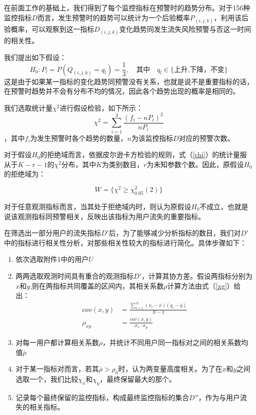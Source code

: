 \documentclass{my_paper}
\begin{document}
在前面工作的基础上，我们得到了每个监控指标在预警时的趋势分布。对于156种监控指标$D$而言，发生预警时的趋势可以统计为一个后验概率$P_{(i,j,k)}$，利用该后验概率，可以观察到这一指标$D_{(i,j,k)}$变化趋势同发生流失风险预警与否这一时间的相关性。

我们提出如下假设：
\begin{equation}
    H_0 : P_{l} = P(Q_{(i,j,k)}=q_l) = \frac{1}{3} ,\quad \text{其中} \quad q_l \in\{\text{上升,下降，不变}\}
\end{equation}
这是由于如果某一指标的变化趋势同预警没有关系，也就是说不是重要指标的话，在预警时趋势并不会有分布不均的情况，因此各个趋势出现的概率是相同的。

我们选取统计量$\chi ^2$进行假设检验，如下所示：
\begin{equation}
    \chi ^2 = \sum_{i=1}^3\frac{(f_i-nP_i)^2}{nP_i}
    \label{chi}
\end{equation}
，其中$f_i$为发生预警时各个趋势的数量，$n$为该监控指标$D$对应的预警次数。

对于假设$H_0$的拒绝域而言，依据皮尔逊卡方检验的规则\cite{3}，式（\ref{chi}）的统计量服从于$K-r-1$的$\chi ^2$分布，其中$K$为类别数目，$r$为未知参数个数。因此，原假设$H_0$的拒绝域为：

\begin{equation}
   W = \{\chi^2 \geq  \chi^2_{0.05}(2) \}
\label{}
\end{equation}

对于任意观测指标而言，当其处于拒绝域内时，则认为原假设$H_0$不成立，也就是说该观测指标同预警相关，反映出该指标为用户流失的重要指标。

在筛选出一部分用户的流失指标$D'$后，为了能够减少分析指标的数目，我们对$D'$中的指标进行相关性分析，对那些相关性较大的指标进行简化。具体步骤如下：
\begin{enumerate}
    \item 依次选取附件1中的用户$U$
    \item 两两选取观测时间具有重合的观测指标$D'$，计算其协方差。假设两指标分别为$x$和$y$,则在两指标共同覆盖的区间内，其相关系数$\rho$计算方法由式（\ref{xg}）给出：
    \begin{align}
    cov(x,y) &= \frac{\sum_{i=1}^N(x_i-\bar{x} )(y_i-\bar{y})}{N-1}\\
    \rho_{xy} &= \frac{cov(x,y)}{\sigma_x\cdot\sigma_y}
    \label{xg}
    \end{align}
    \item 对每一用户都计算相关系数$\rho$，并统计不同用户同一指标对之间的相关系数均值$\bar{\rho}$
    \item 对于某一指标对而言，若其$\bar{\rho} > \rho_0$时，认为两变量高度相关。为了在$x$和$y$之间选取一个，我们比较$\chi_x$和$\chi_y$，最终保留最大的那个。
    \item 记录每个最终保留的监控指标，构成最终监控指标的集合$D''$，作为与用户流失的相关指标。

\end{enumerate}
\end{document}
